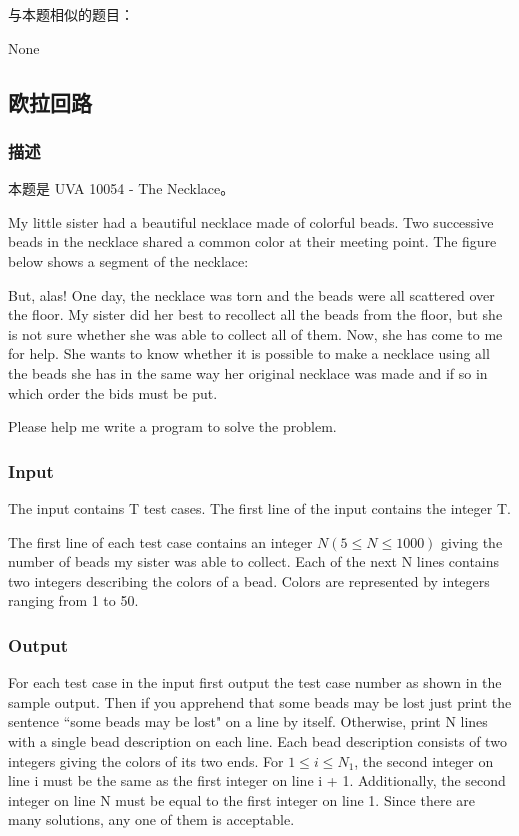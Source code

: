 与本题相似的题目：
\begindot
\item  None
\myenddot

\subsection{欧拉回路}

\subsubsection{描述}
本题是 UVA 10054 - The Necklace。

My little sister had a beautiful necklace made of colorful beads. Two successive beads in the 
necklace shared a common color at their meeting point. The figure below shows a segment of 
the necklace:

\centerline{}

But, alas! One day, the necklace was torn and the beads were all scattered over the floor. 
My sister did her best to recollect all the beads from the floor, but she is not sure 
whether she was able to collect all of them. Now, she has come to me for help. She wants
 to know whether it is possible to make a necklace using all the beads she has in the same
 way her original necklace was made and if so in which order the bids must be put.

Please help me write a program to solve the problem.

\subsubsection{Input}
The input contains T test cases. The first line of the input contains the integer T.

The first line of each test case contains an integer $N(5 \leq N \leq 1000)$ giving the number of beads 
my sister was able to collect. Each of the next N lines contains two integers describing 
the colors of a bead. Colors are represented by integers ranging from 1 to 50.

\subsubsection{Output}
For each test case in the input first output the test case number as shown in the sample output. Then 
if you apprehend that some beads may be lost just print the sentence ``some beads may be lost" on a 
line by itself. Otherwise, print N lines with a single bead description on each line. Each bead 
description consists of two integers giving the colors of its two ends. For $1 \leq i \leq N_1$, the second integer 
on line i must be the same as the first integer on line i + 1. Additionally, the second integer 
on line N must be equal to the first integer on line 1. Since there are many solutions, any one
 of them is acceptable.

